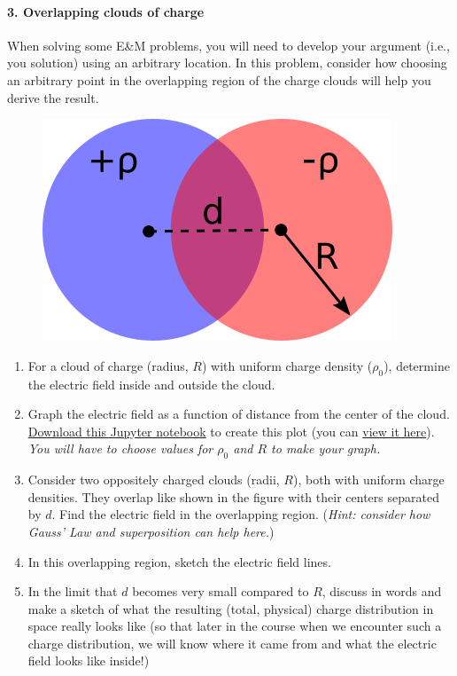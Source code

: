 \documentclass[11pt]{article}
\def\tightlist{}
\begin{document}
\paragraph{3. Overlapping clouds of
charge}\label{overlapping-clouds-of-charge}

When solving some E\&M problems, you will need to develop your argument
(i.e., you solution) using an arbitrary location. In this problem,
consider how choosing an arbitrary point in the overlapping region of
the charge clouds will help you derive the result.

\begin{figure}[htbp]
\centering
\includegraphics[width=0.4\linewidth]{./images/hw3/overlapping_clouds.png}
\end{figure}

\begin{enumerate}
\def\labelenumi{\arabic{enumi}.}
\tightlist
\item
  For a cloud of charge (radius, \(R\)) with uniform charge density
  (\(\rho_0\)), determine the electric field inside and outside the
  cloud.
\item
  Graph the electric field as a function of distance from the center of
  the cloud. \href{../jupyter/HW3-LinePlotting.ipynb}{Download this
  Jupyter notebook} to create this plot (you can
  \href{https://github.com/dannycab/phy481msu/blob/gh-pages/jupyter/HW3-LinePlotting.ipynb}{view
  it here}). \emph{You will have to choose values for \(\rho_0\) and
  \(R\) to make your graph.}
\item
  Consider two oppositely charged clouds (radii, \(R\)), both with
  uniform charge densities. They overlap like shown in the figure with
  their centers separated by \(d\). Find the electric field in the
  overlapping region. (\emph{Hint: consider how Gauss' Law and
  superposition can help here.})
\item
  In this overlapping region, sketch the electric field lines.
\item
  In the limit that \(d\) becomes very small compared to \(R\), discuss
  in words and make a sketch of what the resulting (total, physical)
  charge distribution in space really looks like (so that later in the
  course when we encounter such a charge distribution, we will know
  where it came from and what the electric field looks like inside!)
\end{enumerate}
\end{document}
